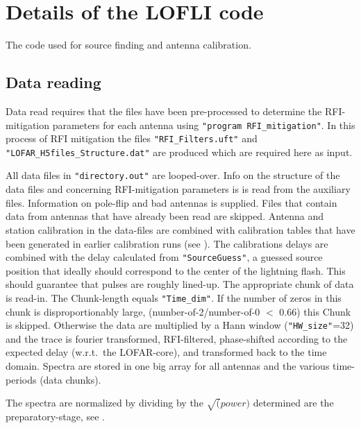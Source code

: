 \section{Details of the LOFLI code}

The code used for source finding and antenna calibration.

\subsection{Data reading}

Data read requires that the files have been pre-processed to determine the RFI-mitigation parameters for each antenna using \verb!"program RFI_mitigation"!. In this process of RFI mitigation the files \verb!"RFI_Filters.uft"! and \verb!"LOFAR_H5files_Structure.dat"! are produced which are required here as input.


All data files in \verb!"directory.out"! are looped-over.
Info on the structure of the data files and concerning RFI-mitigation parameters is is read from the auxiliary files. Information on pole-flip and bad antennas is supplied. Files that contain data from antennas that have already been read are skipped. Antenna and station calibration in the data-files are combined with calibration tables that have been generated in earlier calibration runs (see ). The calibrations delays are combined with the delay calculated from \verb!"SourceGuess"!, a guessed source position that ideally should correspond to the center of the lightning flash. This should guarantee that pulses are roughly lined-up. The appropriate chunk of data is read-in. The Chunk-length equals \verb!"Time_dim"!. If the number of zeros in this chunk is disproportionably large, (number-of-2/number-of-0 $<$ 0.66) this Chunk is skipped. Otherwise the data are multiplied by a Hann window (\verb!"HW_size"!=32) and the trace is fourier transformed, RFI-filtered, phase-shifted according to the expected delay (w.r.t.\ the LOFAR-core), and transformed back to the time domain. Spectra are stored in one big array for all antennas and the various time-periods (data chunks).

The spectra are normalized by dividing by the $\sqrt(power)$ determined are the preparatory-stage, see .

